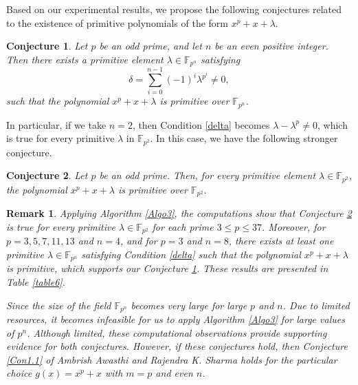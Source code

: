 \documentclass[preprint,12pt]{elsarticle}
\newtheorem{con}{Conjecture}[section]
\newtheorem{rk}{Remark}[section]
\begin{document}
        
        Based on our experimental results, we propose the following conjectures related to the existence of primitive polynomials of the form $x^p+x+\lambda$.
        
        \begin{con}\label{Con4.1}
            Let $p$ be an odd prime, and let $n$ be an even positive integer. Then there exists a primitive element $\lambda\in\mathbb{F}_{p^n}$ satisfying
            \begin{equation*}
                \delta=\sum_{i=0}^{n-1}(-1)^i\lambda^{p^i}\neq 0,
            \end{equation*}
            such that the polynomial $x^p+x+\lambda$ is primitive over $\mathbb{F}_{p^n}$.
        \end{con}

        In particular, if we take $n=2$, then Condition \eqref{delta} becomes $\lambda-\lambda^p\neq 0$, which is true for every primitive $\lambda$ in $\mathbb{F}_{p^2}$. In this case, we have the following stronger conjecture.

        \begin{con}\label{Con4.2}
            Let $p$ be an odd prime. Then, for every primitive element $\lambda\in\mathbb{F}_{p^2}$, the polynomial $x^p+x+\lambda$ is primitive over $\mathbb{F}_{p^2}$.
        \end{con}

    \begin{rk}\label{R4.2}    
         Applying {\upshape Algorithm \ref{Algo3}}, the computations show that {\upshape Conjecture \ref{Con4.2}} is true for every primitive $\lambda\in\mathbb{F}_{p^2}$ for each prime $3\leq p\leq 37$. Moreover, for $p=3,5,7,11,13$ and $n=4$, and for $p=3$ and $n=8$, there exists at least one primitive $\lambda\in\mathbb{F}_{p^n}$ satisfying {\upshape Condition \eqref{delta}} such that the polynomial $x^p+x+\lambda$ is primitive, which supports our {\upshape Conjecture \ref{Con4.1}}. These results are presented in {\upshape Table \ref{table6}}. 
         
         Since the size of the field $\mathbb{F}_{p^n}$ becomes very large for large $p$ and $n$. Due to limited resources, it becomes infeasible for us to apply {\upshape Algorithm \ref{Algo3}} for large values of $p^n$. Although limited, these computational observations provide supporting evidence for both conjectures. However, if these conjectures hold, then {\upshape Conjecture \ref{Con1.1}} of Ambrish Awasthi and Rajendra K. Sharma holds for the particular choice $g(x)=x^p+x$ with $m=p$ and even $n$.
    \end{rk} 
\end{document}
